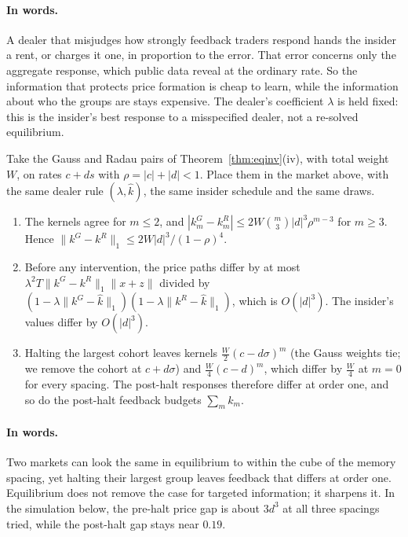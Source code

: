 \paragraph{In words.} A dealer that misjudges how strongly feedback traders respond hands the insider a rent, or charges it one, in proportion to the error. That error concerns only the aggregate response, which public data reveal at the ordinary rate. So the information that protects price formation is cheap to learn, while the information about who the groups are stays expensive. The dealer's coefficient $\lambda$ is held fixed: this is the insider's best response to a misspecified dealer, not a re-solved equilibrium.

\begin{theorem}\label{thm:eqhalt}
Take the Gauss and Radau pairs of Theorem~\ref{thm:eqinv}(iv), with total weight $W$, on rates $c+ds$ with $\rho=|c|+|d|<1$. Place them in the market above, with the same dealer rule $(\lambda,\hat k)$, the same insider schedule and the same draws.
\begin{enumerate}[label=(\roman*),itemsep=1pt]
\item The kernels agree for $m\le2$, and $|k^G_m-k^R_m|\le2W\binom m3|d|^3\rho^{m-3}$ for $m\ge3$. Hence $\|k^G-k^R\|_1\le2W|d|^3/(1-\rho)^4$.
\item Before any intervention, the price paths differ by at most $\lambda^2T\|k^G-k^R\|_1\|x+z\|$ divided by $(1-\lambda\|k^G-\hat k\|_1)(1-\lambda\|k^R-\hat k\|_1)$, which is $O(|d|^3)$. The insider's values differ by $O(|d|^3)$.
\item Halting the largest cohort leaves kernels $\tfrac W2(c-d\sigma)^m$ (the Gauss weights tie; we remove the cohort at $c+d\sigma$) and $\tfrac W4(c-d)^m$, which differ by $\tfrac W4$ at $m=0$ for every spacing. The post-halt responses therefore differ at order one, and so do the post-halt feedback budgets $\sum_mk_m$.
\end{enumerate}
\end{theorem}

\paragraph{In words.} Two markets can look the same in equilibrium to within the cube of the memory spacing, yet halting their largest group leaves feedback that differs at order one. Equilibrium does not remove the case for targeted information; it sharpens it. In the simulation below, the pre-halt price gap is about $3d^3$ at all three spacings tried, while the post-halt gap stays near $0.19$.


